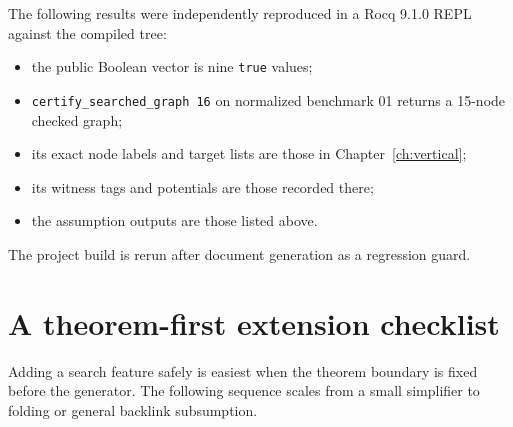\documentclass[11pt,oneside]{book}
\DeclareRobustCommand{\code}[1]{\nolinkurl{#1}}
\begin{document}
The following results were independently reproduced in a Rocq 9.1.0 REPL
against the compiled tree:
\begin{itemize}[leftmargin=*]
\item the public Boolean vector is nine \code{true} values;
\item \code{certify_searched_graph 16} on normalized benchmark 01 returns a
15-node checked graph;
\item its exact node labels and target lists are those in
Chapter~\ref{ch:vertical};
\item its witness tags and potentials are those recorded there;
\item the assumption outputs are those listed above.
\end{itemize}
The project build is rerun after document generation as a regression guard.

\chapter{A theorem-first extension checklist}
\label{ch:extension}

Adding a search feature safely is easiest when the theorem boundary is fixed
before the generator.  The following sequence scales from a small simplifier
to folding or general backlink subsumption.
\end{document}
